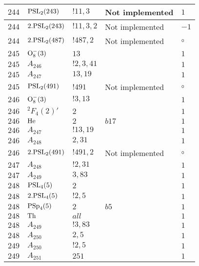 \documentclass[a4paper, 11pt]{article}
\begin{document}
\begin{longtable}{lllll}
        $ 244 $ & $ {\rm PSL}_{2}(243) $ & $ !11, 3 $ &  Not implemented & $ 1$ \\ \hline
        $ 244 $ & $ 2.{\rm PSL}_{2}(243) $ & $ !11, 3, 2 $ &  Not implemented & $ -1$ \\ \hline
        $ 244 $ & $ 2.{\rm PSL}_{2}(487) $ & $ !487, 2 $ &  Not implemented &  $\circ$ \\ \hline
        $ 245 $ & $ {\rm O}_{8}^-(3) $ & $ 13 $ & $ ~ $ & $ 1$ \\ \hline
        $ 245 $ & $ A_{246} $ & $ !2, 3, 41 $ & $ ~ $ & $ 1$ \\ \hline
        $ 245 $ & $ A_{247} $ & $ 13, 19 $ & $ ~ $ & $ 1$ \\ \hline
        $ 245 $ & $ {\rm PSL}_{2}(491) $ & $ !491 $ &  Not implemented &  $\circ$ \\ \hline
        $ 246 $ & $ {\rm O}_{8}^-(3) $ & $ ! 3,13 $ & $ ~ $ & $ 1$ \\ \hline
        $ 246 $ & $ {}^{2}F_{4}(2)' $ & $ 2 $ & $ ~ $ & $ 1$ \\ \hline
        $ 246 $ & $ {\rm He} $ & $ 2 $ & $ b17 $ & $ 1$ \\ \hline
        $ 246 $ & $ A_{247} $ & $ !13, 19 $ & $ ~ $ & $ 1$ \\ \hline
        $ 246 $ & $ A_{248} $ & $ 2, 31 $ & $ ~ $ & $ 1$ \\ \hline
        $ 246 $ & $ 2.{\rm PSL}_{2}(491) $ & $ !491, 2 $ &  Not implemented &  $\circ$ \\ \hline
        $ 247 $ & $ A_{248} $ & $ !2, 31 $ & $ ~ $ & $ 1$ \\ \hline
        $ 247 $ & $ A_{249} $ & $ 3, 83 $ & $ ~ $ & $ 1$ \\ \hline
        $ 248 $ & $ {\rm PSL}_{4}(5) $ & $ 2 $ & $ ~ $ & $ 1$ \\ \hline
        $ 248 $ & $ 2.{\rm PSL}_{4}(5) $ & $ ! 2,5 $ & $ ~ $ & $ 1$ \\ \hline
        $ 248 $ & $ {\rm PSp}_{4}(5) $ & $ 2 $ & $ b5 $ & $ 1$ \\ \hline
        $ 248 $ & $ {\rm Th} $ & $ all $ & $ ~ $ & $ 1$ \\ \hline
        $ 248 $ & $ A_{249} $ & $ !3, 83 $ & $ ~ $ & $ 1$ \\ \hline
        $ 248 $ & $ A_{250} $ & $ 2, 5 $ & $ ~ $ & $ 1$ \\ \hline
        $ 249 $ & $ A_{250} $ & $ !2, 5 $ & $ ~ $ & $ 1$ \\ \hline
        $ 249 $ & $ A_{251} $ & $ 251 $ & $ ~ $ & $ 1$ \\ \hline

\end{longtable}
\end{document}
